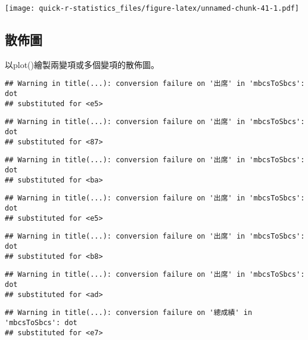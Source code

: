 \documentclass[
]{book}
\newenvironment{Shaded}{\begin{snugshade}}{\end{snugshade}}
\newcommand{\AttributeTok}[1]{\textcolor[rgb]{0.77,0.63,0.00}{#1}}
\newcommand{\FunctionTok}[1]{\textcolor[rgb]{0.00,0.00,0.00}{#1}}
\newcommand{\NormalTok}[1]{#1}
\newcommand{\SpecialCharTok}[1]{\textcolor[rgb]{0.00,0.00,0.00}{#1}}
\newcommand{\StringTok}[1]{\textcolor[rgb]{0.31,0.60,0.02}{#1}}
\begin{document}
\texttt{[image: quick-r-statistics\_files/figure-latex/unnamed-chunk-41-1.pdf]}

\hypertarget{ux6563ux4f48ux5716}{%
\subsection{散佈圖}\label{ux6563ux4f48ux5716}}

以plot()繪製兩變項或多個變項的散佈圖。

\begin{Shaded}
\end{Shaded}

\begin{verbatim}
## Warning in title(...): conversion failure on '出席' in 'mbcsToSbcs': dot
## substituted for <e5>
\end{verbatim}

\begin{verbatim}
## Warning in title(...): conversion failure on '出席' in 'mbcsToSbcs': dot
## substituted for <87>
\end{verbatim}

\begin{verbatim}
## Warning in title(...): conversion failure on '出席' in 'mbcsToSbcs': dot
## substituted for <ba>
\end{verbatim}

\begin{verbatim}
## Warning in title(...): conversion failure on '出席' in 'mbcsToSbcs': dot
## substituted for <e5>
\end{verbatim}

\begin{verbatim}
## Warning in title(...): conversion failure on '出席' in 'mbcsToSbcs': dot
## substituted for <b8>
\end{verbatim}

\begin{verbatim}
## Warning in title(...): conversion failure on '出席' in 'mbcsToSbcs': dot
## substituted for <ad>
\end{verbatim}

\begin{verbatim}
## Warning in title(...): conversion failure on '總成績' in 'mbcsToSbcs': dot
## substituted for <e7>
\end{verbatim}
\end{document}
